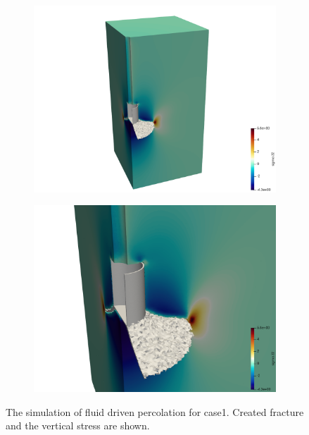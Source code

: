 \begin{figure}[!ht]
\begin{subfigure}[c]{0.48\textwidth}
\includegraphics[width=1\textwidth]{figures/Keita_ME2_case1.png}
\subcaption{}
\label{fig:Keita_ME2_VPF_case1_zoomout}
\end{subfigure}
\hfill
\begin{subfigure}[c]{0.48\textwidth}
\includegraphics[width=1\textwidth]{figures/Keita_ME2_case1_zoomin.png}
\subcaption{}
\label{fig:Keita_ME2_VPF_case1_zeemin}
\end{subfigure}
\caption{The simulation of fluid driven percolation for case1. Created fracture and the vertical stress are shown.}
\label{fig:Keita_ME2_VPF_case1}
\end{figure}

